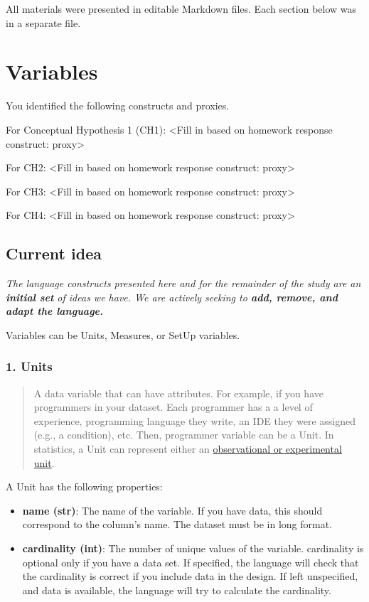 All materials were presented in editable Markdown files. Each section below was in a separate file.

\section{Variables}

You identified the following constructs and proxies.

For Conceptual Hypothesis 1 (CH1): <Fill in based on homework response construct: proxy>

For CH2:  <Fill in based on homework response construct: proxy>

For CH3: <Fill in based on homework response construct: proxy>

For CH4: <Fill in based on homework response construct: proxy>

\subsection{Current idea}
\emph{The language constructs presented here and for the remainder of
the study are an \textbf{initial set} of ideas we have. We are actively
seeking to \textbf{add, remove, and adapt the language.}}

Variables can be Units, Measures, or SetUp variables.

\subsubsection{1. Units}

\begin{quote}
A data variable that can have attributes. For example, if you have
programmers in your dataset. Each programmer has a a level of
experience, programming language they write, an IDE they were assigned
(e.g., a condition), etc. Then, programmer variable can be a Unit. In
statistics, a Unit can represent either an
\href{https://en.wikipedia.org/wiki/Statistical_unit}{observational or
experimental unit}.
\end{quote}


A Unit has the following properties:
\begin{itemize}
    \item \textbf{name (str)}: The name of the variable. If you have data, this should correspond to the column's name. The dataset must be in long format.
    \item \textbf{cardinality (int)}: The number of unique values of the variable. cardinality is optional only if you have a data set. If specified, the language will check that the cardinality is correct if you include data in the design. If left unspecified, and data is available, the language will try to calculate the cardinality.
\end{itemize}

